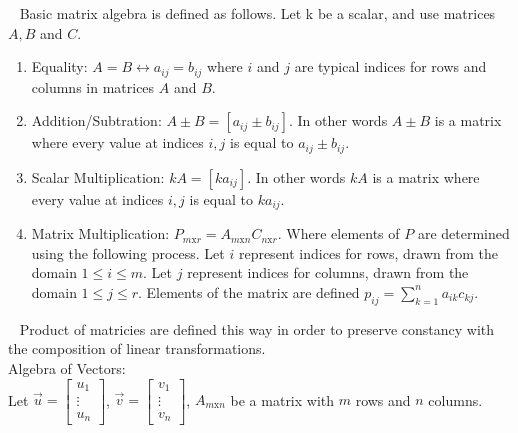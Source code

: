 \documentclass[12pt]{article}
\begin{document}
$\,\,\,$ Basic matrix algebra is defined as follows. Let k be a scalar, and use matrices $A,B$ and $C$.
\begin{enumerate}
\item Equality: $A=B\leftrightarrow a_{ij}=b_{ij}$ where $i$ and $j$ are typical indices for rows and columns in matrices $A$ and $B$.
\item Addition/Subtration: $A\pm B=\left[ a_{ij}\pm b_{ij}\right]$. In other words $A\pm B$ is a matrix where every value at indices $i,j$ is equal to $a_{ij}\pm b_{ij}$.
\item Scalar Multiplication: $kA=\left[ ka_{ij}\right]$. In other words $kA$ is a matrix where every value at indices $i,j$ is equal to $ka_{ij}$.
\item Matrix Multiplication: $P_{m\text{x}r}=A_{m\text{x}n}C_{n\text{x}r}$. Where elements of $P$ are determined using the following process. Let $i$ represent indices for rows, drawn from the domain $1\leq i\leq m$. Let $j$ represent indices for columns, drawn from the domain $1\leq j \leq r$. Elements of the matrix are defined $p_{ij}=\sum_{k=1}^{n} a_{ik}c_{kj}$.
\end{enumerate}

$\,\,\,$ Product of matricies are defined this way in order to preserve constancy with the composition of linear transformations.\\

Algebra of Vectors:\\

Let $\vec{u}=\left[\begin{matrix}u_1\\\vdots\\u_n\end{matrix}\right]$,
$\vec{v}=\left[\begin{matrix}v_1\\\vdots\\v_n\end{matrix}\right]$,
$A_{m\text{x}n}$ be a matrix with $m$ rows and $n$ columns.\\\\
\end{document}
